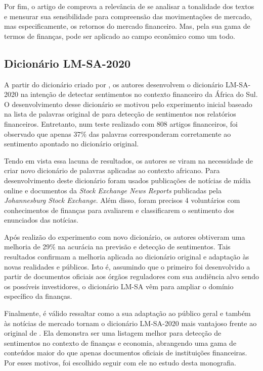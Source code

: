 Por fim, o artigo de  comprova a relevância de se analisar a tonalidade dos textos e mensurar sua sensibilidade para compreensão das movimentações de mercado, mas especificamente, os retornos do mercado financeiro. Mas, pela sua gama de termos de finanças, pode ser aplicado ao campo econômico como um todo.

\subsection{Dicionário LM-SA-2020}

A partir do dicionário criado por , os autores  desenvolvem o dicionário LM-SA-2020 na intenção de detectar sentimentos no contexto financeiro da África do Sul. O desenvolvimento desse dicionário se motivou pelo experimento inicial baseado na lista de palavras original de  para detecção de sentimentos nos relatórios financeiros. Entretanto, num teste realizado com 808 artigos financeiros, foi observado que apenas 37\% das palavras corresponderam corretamente ao sentimento apontado no dicionário original. 

Tendo em vista essa lacuna de resultados, os autores se viram na necessidade de criar novo dicionário de palavras aplicadas ao contexto africano. Para desenvolvimento deste dicionário foram usados publicações de notícias de mídia online e documentos da \textit{Stock Exchange News Reports} publicadas pela \textit{Johannesburg Stock Exchange}. Além disso, foram precisos 4 voluntários com conhecimentos de finanças para avaliarem e classificarem o sentimento dos enunciados das notícias.

Após realizão do experimento com novo dicionário, os autores obtiveram uma melhoria de 29\% na acurácia na previsão e detecção de sentimentos. Tais resultados confirmam a melhoria aplicada ao dicionário original e adaptação às novas realidades e públicos. Isto é, assumindo que o primeiro foi desenvolvido a partir de documentos oficiais aos órgãos reguladores com sua audiência alvo sendo os possíveis investidores, o dicionário LM-SA vêm para ampliar o domínio específico da finanças.

Finalmente, é válido ressaltar como a sua adaptação ao público geral e também às notícias de mercado tornam o dicionário LM-SA-2020 mais vantajoso frente ao original de . Ela demonstra ser uma listagem melhor para detecção de sentimentos no contexto de finanças e economia, abrangendo uma gama de conteúdos maior do que apenas documentos oficiais de instituições financeiras. Por esses motivos, foi escolhido seguir com ele no estudo desta monografia.

